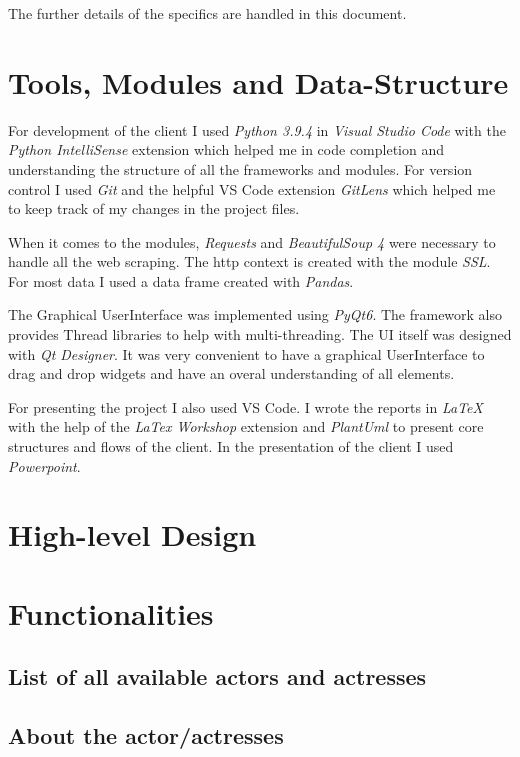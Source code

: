 \documentclass[12pt]{article}
\begin{document}
The further details of the specifics are handled in this document.

\section{Tools, Modules and Data-Structure}
For development of the client I used \textit{Python 3.9.4} in \textit{Visual Studio 
Code} with the \textit{Python IntelliSense} extension which helped me in code 
completion and understanding the structure of all the frameworks and modules. For 
version control I used \textit{Git} and the helpful VS Code extension 
\textit{GitLens} which helped me to keep track of my changes in the project files.

When it comes to the modules, \textit{Requests} and \textit{BeautifulSoup 4} were  
necessary to handle all the web scraping. The http context is created with the 
module \textit{SSL}. For most data I used a data frame created with \textit{Pandas}.

The Graphical UserInterface was implemented using \textit{PyQt6}. The framework also
provides Thread libraries to help with multi-threading.
The UI itself was designed with \textit{Qt Designer}. It was very convenient to
have a graphical UserInterface to drag and drop widgets and have an overal 
understanding of all elements.

For presenting the project I also used VS Code. I wrote the reports in \textit{\LaTeX} with the help of the \textit{LaTex Workshop} extension and 
\textit{PlantUml} to present core structures and flows of the client.
In the presentation of the client I used \textit{Powerpoint}. 

\section{High-level Design}

\section{Functionalities}
\subsection{List of all available actors and actresses} \label{list-actors}

\subsection{About the actor/actresses} \label{about}
\end{document}

